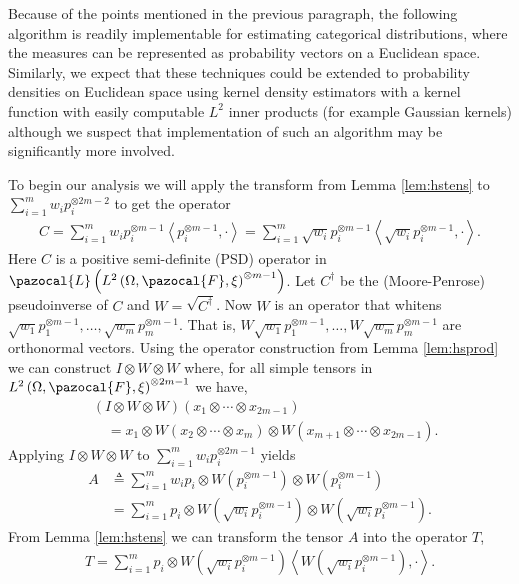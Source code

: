 \documentclass[aos,preprint]{imsart}
\def\l{\left}
\def\r{\right}
\def\sF{\pazocal{F}}
\def\sL{\pazocal{L}}
\theoremstyle{plain}
\theoremstyle{defintion}
\begin{document}
Because of the points mentioned in the previous paragraph, the following algorithm is readily implementable for estimating categorical distributions, where the measures can be represented as probability vectors on a Euclidean space. Similarly, we expect that these techniques could be extended to probability densities on Euclidean space using kernel density estimators with a kernel function with easily computable $L^2$ inner products (for example Gaussian kernels) although we suspect that implementation of such an algorithm may be significantly more involved.


To begin our analysis we will apply the transform from Lemma \ref{lem:hstens} to $\sum_{i=1}^m w_i p_i^{\otimes 2m-2}$ to get the operator
\begin{eqnarray*}
	C = \sum_{i=1}^m w_i p_i^{\otimes m-1} \l<p_i^{\otimes m-1} ,\cdot\r> = \sum_{i=1}^m \sqrt{w_i} p_i^{\otimes m-1} \l<\sqrt{w_i}p_i^{\otimes m-1} ,\cdot\r>.
\end{eqnarray*}
\sloppy Here $C$ is a positive semi-definite (PSD) operator in  $\sL \l(L^2\left( \Omega,\sF,\xi \right)^{\otimes m-1}\r)$. Let $C^\dagger$ be the (Moore-Penrose) pseudoinverse of $C$ and $W = \sqrt{C^\dagger}$. Now $W$ is an operator that whitens $\sqrt{w_1} p_1^{\otimes m-1},\ldots, \sqrt{w_m}p_m^{\otimes m-1}$. That is, $W \sqrt{w_1} p_1^{\otimes m-1},\ldots,W \sqrt{w_m}p_m^{\otimes m-1}$ are orthonormal vectors. Using the operator construction from Lemma \ref{lem:hsprod} we can construct $I\otimes W\otimes W$ where, for all simple tensors in $L^2\left( \Omega,\sF,\xi \right)^{\otimes 2m-1}$ we have,
\begin{align*}
	&(I\otimes W \otimes W) \left( x_1\otimes \cdots \otimes x_{2m-1} \right) \\
	&\quad = x_1 \otimes W\left( x_2 \otimes \cdots \otimes x_m \right)  \otimes W\left(x_{m+1} \otimes \cdots \otimes x_{2m-1}  \right).
\end{align*}
Applying $I\otimes W \otimes W$ to $\sum_{i=1}^{m} w_i p_i^{\otimes 2m-1}$ yields
\begin{align*}
	A 
	&\triangleq \sum_{i=1}^m w_i p_i \otimes  W\l(p_i^{\otimes m-1}\r)\otimes W\l( p_{i}^{\otimes m-1}\r) \\
	&= \sum_{i=1}^m  p_i \otimes  W\l(\sqrt{w_i}p_i^{\otimes m-1}\r)\otimes W\l(\sqrt{w_i} p_{i}^{\otimes m-1}\r).
\end{align*}
From Lemma \ref{lem:hstens} we can transform the tensor $A$ into the operator $T$,
\begin{eqnarray*}
	T = \sum_{i=1}^m  p_i \otimes W\l( \sqrt{w_i} p_{i}^{\otimes m-1}\r)\l<W\l(\sqrt{w_i}p_i^{\otimes m-1}\r),\cdot\r>  .
\end{eqnarray*}
\end{document}
